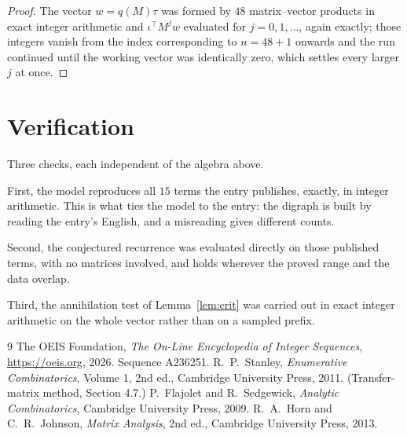 \documentclass[11pt,a4paper]{article}
\theoremstyle{plain}
\theoremstyle{definition}
\begin{document}
\begin{proof}
The vector $w=q(M)\tau$ was formed by $48$ matrix--vector products in exact integer
arithmetic and $\iota^{\!\top}M^{j}w$ evaluated for $j=0,1,\dots$, again exactly; those
integers vanish from the index corresponding to $n=48+1$ onwards and the run continued
until the working vector was identically zero, which settles every larger $j$ at once.
\end{proof}

\section{Verification}

Three checks, each independent of the algebra above.

First, the model reproduces all $15$ terms the entry publishes, exactly, in integer
arithmetic. This is what ties the model to the entry: the digraph is built by reading the
entry's English, and a misreading gives different counts.

Second, the conjectured recurrence was evaluated directly on those published terms, with no
matrices involved, and holds wherever the proved range and the data overlap.

Third, the annihilation test of Lemma~\ref{lem:crit} was carried out in exact integer
arithmetic on the whole vector rather than on a sampled prefix.

\begin{thebibliography}{9}
 The OEIS Foundation, \emph{The On-Line Encyclopedia of Integer
Sequences}, \url{https://oeis.org}, 2026. Sequence A236251.
 R.~P.~Stanley, \emph{Enumerative Combinatorics}, Volume 1, 2nd ed.,
Cambridge University Press, 2011. (Transfer-matrix method, Section 4.7.)
 P.~Flajolet and R.~Sedgewick, \emph{Analytic Combinatorics}, Cambridge
University Press, 2009.
 R.~A.~Horn and C.~R.~Johnson, \emph{Matrix Analysis}, 2nd ed., Cambridge
University Press, 2013.
\end{thebibliography}
\end{document}

